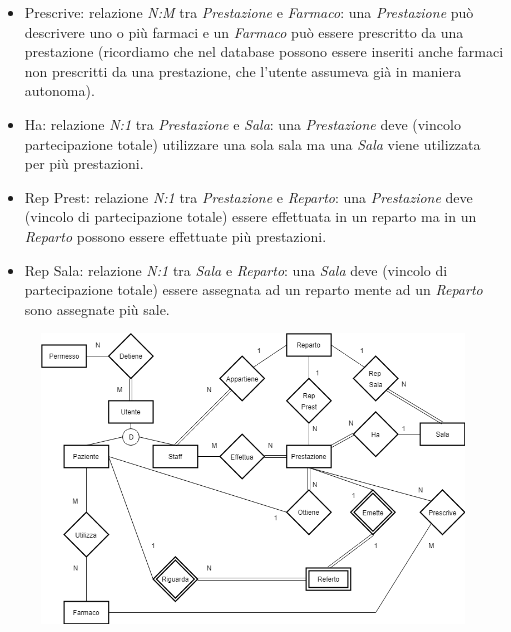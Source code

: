 \documentclass[paper=a4, fontsize=11pt,x11names]{report}
\begin{document}
\begin{itemize}
\item Prescrive: relazione \textit{N:M} tra \textit{Prestazione} e \textit{Farmaco}: una \textit{Prestazione} può descrivere uno o più farmaci e un \textit{Farmaco} può essere prescritto da una prestazione (ricordiamo che nel database possono essere inseriti anche farmaci non prescritti da una prestazione, che l'utente assumeva già in maniera autonoma).
\item Ha: relazione \textit{N:1} tra \textit{Prestazione} e \textit{Sala}: una \textit{Prestazione} deve (vincolo partecipazione totale) utilizzare una sola sala ma una \textit{Sala} viene utilizzata per più prestazioni.
\item Rep Prest: relazione \textit{N:1} tra \textit{Prestazione} e \textit{Reparto}: una \textit{Prestazione} deve (vincolo di partecipazione totale) essere effettuata in un reparto ma in un \textit{Reparto} possono essere effettuate più prestazioni.
\item Rep Sala: relazione \textit{N:1} tra \textit{Sala} e \textit{Reparto}: una \textit{Sala} deve (vincolo di partecipazione totale) essere assegnata ad un reparto mente ad un \textit{Reparto} sono assegnate più sale. 
\end{itemize}


\begin{landscape}
\begin{figure}[h!]
\includegraphics[scale=0.8]{Diagramma}
\end{figure}
\end{landscape}
\end{document}

